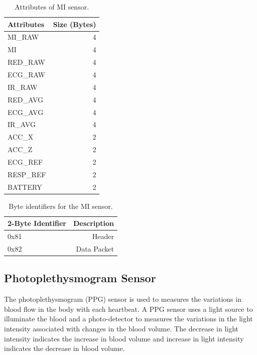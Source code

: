 \renewcommand{\arraystretch}{2}
\begin{table}
	\caption{Attributes of MI sensor.} \label{tab:att_mi}
	
	\begin{center}
		\begin{tabular}{ | l | r | }
			\hline
			\textbf{Attributes} & \textbf{Size (Bytes)} \\ \hline
			MI\_RAW  & 4 \\ \hline
			MI  & 4  \\ \hline
			RED\_RAW  & 4  \\ \hline
			ECG\_RAW  & 4  \\ \hline
			IR\_RAW  & 4  \\ \hline
			RED\_AVG  & 4  \\ \hline
			ECG\_AVG  & 4  \\ \hline
			IR\_AVG  & 4  \\ \hline
			ACC\_X  & 2  \\ \hline
			ACC\_Z  & 2  \\ \hline
			ECG\_REF  & 2  \\ \hline
			RESP\_REF  & 2  \\ \hline
			BATTERY  & 2  \\ \hline
		\end{tabular}
	\end{center}
	
\end{table}


\renewcommand{\arraystretch}{2}
\begin{table}
	\caption{Byte identifiers for the MI sensor.} \label{tab:bi_mi}
	
	\begin{center}
		\begin{tabular}{ | l | r | }
			\hline
			\textbf{2-Byte Identifier} & \textbf{Description} \\ \hline
			0x81  & Header \\ \hline
			0x82  & Data Packet  \\ \hline
		\end{tabular}
	\end{center}
	
\end{table}

\subsection{Photoplethysmogram Sensor}
The photoplethysmogram (PPG) sensor is used to measures the variations in blood flow in the body with each heartbeat. A PPG sensor uses a light source to illuminate the blood and a photo-detector to measures the variations in the light intensity associated with changes in the blood volume. The decrease in light intensity indicates the increase in blood volume and increase in light intensity indicates the decrease in blood volume.

